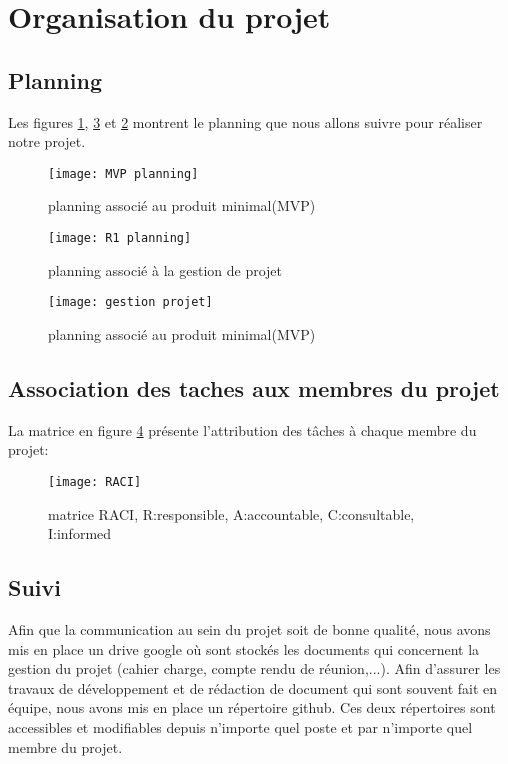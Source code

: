 \chapter*{Organisation du projet}
\label{sec:organisation}
\section*{Planning}
Les figures \ref{fig:mvp-plan}, \ref{fig:gestion-proj} et \ref{fig:r1-plan} montrent le planning que nous allons suivre pour réaliser notre projet.

\begin{figure}[!ht]
	\centering
	\texttt{[image: MVP planning]}
	\caption{planning associé au produit minimal(MVP)}
	\label{fig:mvp-plan}
\end{figure}

\begin{figure}[!ht]
	\centering
	\texttt{[image: R1 planning]}
	\caption{planning associé à la gestion de projet}
	\label{fig:r1-plan}
\end{figure}

\begin{figure}[!ht]
	\centering
	\texttt{[image: gestion projet]}
	\caption{planning associé au produit minimal(MVP)}
	\label{fig:gestion-proj}
\end{figure}

\section*{Association des taches aux membres du projet}
La matrice en figure \ref{fig:raci} présente l'attribution des tâches à chaque membre du projet:


\begin{figure}[!h]
	\centering
	\texttt{[image: RACI]}
	\caption{matrice RACI, R:responsible, A:accountable, C:consultable, I:informed}
	\label{fig:raci}
\end{figure}
\section*{Suivi}
Afin que la communication au sein du projet soit de bonne qualité, nous avons mis en place un drive google où sont stockés les documents qui concernent la gestion du projet (cahier charge, compte rendu de réunion,...). Afin d'assurer les travaux de développement et de rédaction de document qui sont souvent fait en équipe, nous avons mis en place un répertoire github. Ces deux répertoires sont accessibles et modifiables depuis n'importe quel poste et par n'importe quel membre du projet. 

